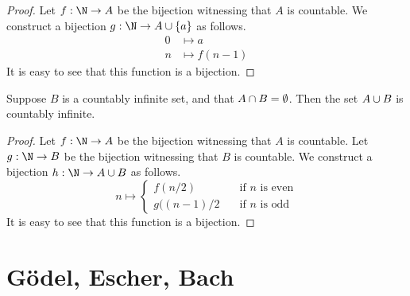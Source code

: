 \documentclass[11pt,letterpaper]{article}
\begin{document}
\begin{proof}
    Let $f : \N \to A$ be the bijection witnessing that $A$ is countable.
    We construct a bijection $g : \N \to A \union \setof{a}$ as follows.
    \begin{align*}
        0 &\mapsto a \\
        n &\mapsto f(n-1)
    \end{align*}
    It is easy to see that this function is a bijection.
\end{proof}

\begin{prop}
    Suppose $B$ is a countably infinite set, and that
    $A \cap B = \emptyset$.
    Then the set $A \cup B$ is countably infinite.
\end{prop}

\begin{proof}
    Let $f : \N \to A$ be the bijection witnessing that $A$ is countable.
    Let $g : \N \to B$ be the bijection witnessing that $B$ is countable.
    We construct a bijection $h : \N \to A \union B$ as follows.
    \begin{equation*}
        n \mapsto \begin{cases}
            f(n/2) &\quad\text{if $n$ is even} \\
            g((n-1)/2 &\quad\text{if $n$ is odd}
        \end{cases}
    \end{equation*}
    It is easy to see that this function is a bijection.
\end{proof}

\section{G\"odel, Escher, Bach}
\end{document}
